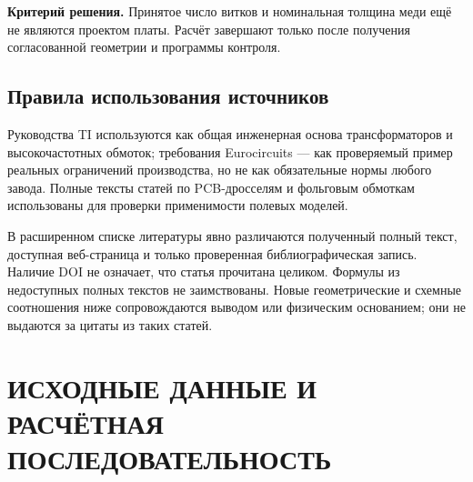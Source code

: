 \documentclass[14pt,a4paper]{extarticle}
\newcommand{\criterion}{\par\noindent\textbf{Критерий решения.} }
\begin{document}
\criterion Принятое число витков и номинальная толщина меди ещё не являются проектом платы. Расчёт завершают только после получения согласованной геометрии и программы контроля.

\subsection{Правила использования источников}
Руководства TI используются как общая инженерная основа трансформаторов и высокочастотных обмоток; требования Eurocircuits --- как проверяемый пример реальных ограничений производства, но не как обязательные нормы любого завода. Полные тексты статей по PCB-дросселям и фольговым обмоткам использованы для проверки применимости полевых моделей.\cite{web1,web2,web17,web22,schaefer,ewaldfoil}

В расширенном списке литературы явно различаются полученный полный текст, доступная веб-страница и только проверенная библиографическая запись. Наличие DOI не означает, что статья прочитана целиком. Формулы из недоступных полных текстов не заимствованы. Новые геометрические и схемные соотношения ниже сопровождаются выводом или физическим основанием; они не выдаются за цитаты из таких статей.

\section{ИСХОДНЫЕ ДАННЫЕ И РАСЧЁТНАЯ ПОСЛЕДОВАТЕЛЬНОСТЬ}
\label{pl:inputs}
\end{document}
